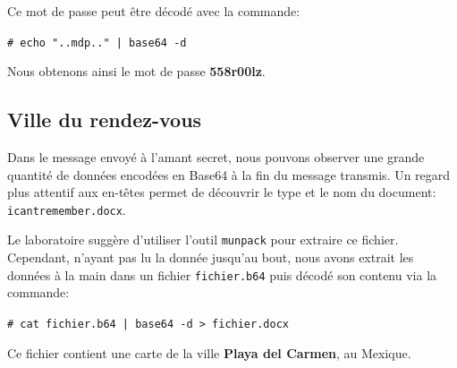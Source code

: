 \documentclass[11pt,a4paper]{article}
\newcommand{\shellcmd}[1]{\texttt{\footnotesize\# #1}}
\begin{document}
Ce mot de passe peut être décodé avec la commande:

\shellcmd{echo "..mdp.." | base64 -d}

Nous obtenons ainsi le mot de passe \textbf{558r00lz}.

\subsection{Ville du rendez-vous}

Dans le message envoyé à l'amant secret, nous pouvons observer une grande quantité de données encodées en Base64 à la fin du message transmis. Un regard plus attentif aux en-têtes permet de découvrir le type et le nom du document: \texttt{icantremember.docx}.

Le laboratoire suggère d'utiliser l'outil \texttt{munpack} pour extraire ce fichier. Cependant, n'ayant pas lu la donnée jusqu'au bout, nous avons extrait les données à la main dans un fichier \texttt{fichier.b64} puis décodé son contenu via la commande:

\shellcmd{cat fichier.b64 | base64 -d > fichier.docx}

Ce fichier contient une carte de la ville \textbf{Playa del Carmen}, au Mexique.
\end{document}
